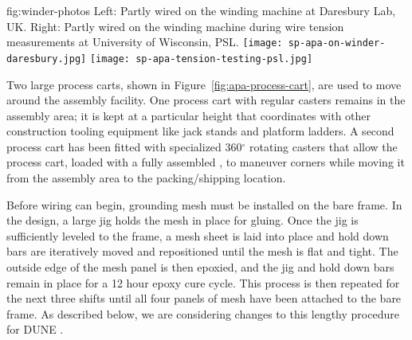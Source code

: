 
\begin{dunefigure}{fig:winder-photos}
{Left: Partly wired   on the winding machine at Daresbury Lab, UK. Right: Partly wired   on the winding machine during wire tension measurements at University of Wisconsin, PSL.}
\texttt{[image: sp-apa-on-winder-daresbury.jpg]}
\texttt{[image: sp-apa-tension-testing-psl.jpg]}
\end{dunefigure}

Two large process carts, shown in Figure~\ref{fig:apa-process-cart}, are used to move  around the assembly facility. 
One process cart with regular casters remains in the assembly area; it is kept at a particular height that coordinates with other construction tooling equipment like jack stands and platform ladders. A second process cart has been fitted with specialized 360$^\circ$ rotating casters that allow the process cart, loaded with a fully assembled , to maneuver corners while moving it from the assembly area to the packing/shipping location.

Before wiring can begin, grounding mesh must be installed on the bare frame. In the  design, a large jig holds the mesh in place for gluing. Once the jig is sufficiently leveled to the frame, a mesh sheet is laid into place and hold down bars are iteratively moved and repositioned until the mesh is flat and tight.  The outside edge of the mesh panel is then epoxied, and the jig and hold down bars remain in place for a 12 hour epoxy cure cycle.  This process is then repeated for the next three shifts until all four panels of mesh have been attached to the bare  frame.  As described below, we are considering changes to this lengthy procedure for DUNE .  

